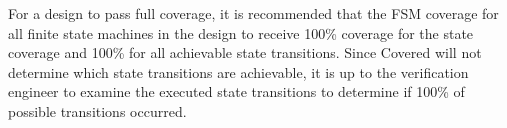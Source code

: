  For a design to pass full coverage, it is recommended that the FSM coverage for all finite state machines in the design to receive 100\% coverage for the state coverage and 100\% for all achievable state transitions. Since Covered will not determine which state transitions are achievable, it is up to the verification engineer to examine the executed state transitions to determine if 100\% of possible transitions occurred.

